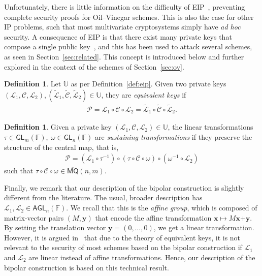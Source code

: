 \documentclass[draft, 12pt, a4paper, oneside]{memoir}
\theoremstyle{definition}
\newtheorem{definition}[theorem]{Definition}
\begin{document}
Unfortunately, there is little information on the difficulty of EIP~\cite[p. 69]{Thomae:201306}, preventing complete security proofs for Oil--Vinegar schemes. This is also the case for other IP problems, such that most multivariate cryptosystems simply have \emph{ad hoc} security. A consequence of EIP is that there exist many private keys that compose a single public key~\cite{Wolf:201104}, and this has been used to attack several schemes, as seen in Section~\ref{sec:related}. This concept is introduced below and further explored in the context of the schemes of Section~\ref{sec:ov}.

\begin{definition}
  Let $\mathbb{U}$ as per Definition~\ref{def:eip}. Given two private keys $(\mathcal{L}_{1}, \mathcal{C}, \mathcal{L}_{2}), (\widetilde{\mathcal{L}}_{1}, \widetilde{\mathcal{C}}, \widetilde{\mathcal{L}}_{2}) \in \mathbb{U}$, they are \emph{equivalent keys} if
  \begin{align}
    \mathcal{P} = \mathcal{L}_{1} \circ \mathcal{C} \circ \mathcal{L}_{2}
      = \widetilde{\mathcal{L}}_{1} \circ \widetilde{\mathcal{C}} \circ \widetilde{\mathcal{L}}_{2}.
  \end{align}
\end{definition}

\begin{definition}
  Given a private key $(\mathcal{L}_{1}, \mathcal{C}, \mathcal{L}_{2}) \in \mathbb{U}$, the linear transformations $\tau \in \mathsf{GL}_{m}(\mathbb{F}),\: \omega \in \mathsf{GL}_{n}(\mathbb{F})$ are \emph{sustaining transformations} if they preserve the structure of the central map, that is,
  \begin{align}
    \mathcal{P} = (\mathcal{L}_{1} \circ \tau^{-1}) \circ (\tau \circ \mathcal{C} \circ \omega) \circ (\omega^{-1} \circ \mathcal{L}_{2})
  \end{align}
  such that $\tau \circ \mathcal{C} \circ \omega \in \overline{\mathsf{MQ}}(n, m)$.
\end{definition}

Finally, we remark that our description of the bipolar construction is slightly different from the literature. The usual, broader description has $\mathcal{L}_{1}, \mathcal{L}_{2} \in \mathsf{AGL}_{n}(\mathbb{F})$. We recall that this is the \emph{affine group}, which is composed of matrix-vector pairs $(M, \mathbf{y})$ that encode the affine transformation $\mathbf{x} \mapsto M\mathbf{x} \bm{+} \mathbf{y}$. By setting the translation vector $\mathbf{y} = (0, \dots, 0)$, we get a linear transformation. However, it is argued in~\cite[Remark 3.1]{Wolf:201104} that due to the theory of equivalent keys, it is not relevant to the security of most schemes based on the bipolar construction if $\mathcal{L}_{1}$ and $\mathcal{L}_{2}$ are linear instead of affine transformations. Hence, our description of the bipolar construction is based on this technical result. 
\end{document}
